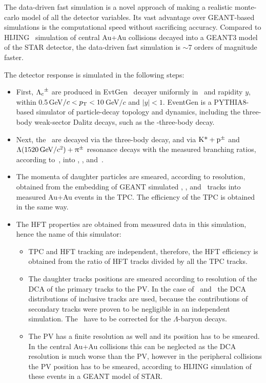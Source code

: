 The data-driven fast simulation is a novel approach of making a realistic monte-carlo model of all the detector variables. Its vast advantage over GEANT-based~\cite{GEANT} simulations is the computational speed without sacrificing accuracy. Compared to HIJING~\cite{HIJING} simulation of central Au+Au collisions decayed into a GEANT3 model of the STAR detector, the data-driven fast simulation is $\sim$7 orders of magnitude faster.

The detector response is simulated in the following steps:
\begin{itemize}
 \item First, ${\Lambda_\text{c}}^\pm$ are produced in EvtGen~\cite{EvtGen} decayer uniformly in \pt\ and rapidity $y$, within 0.5$\,$GeV$/c < {p_{\mathrm{T}}} < 10\,$GeV$/c$ and $|y| < 1$\@. EventGen is a PYTHIA8-based simulator of particle-decay topology and dynamics, including the three-body weak-sector Dalitz decays, such as the \Lambdac-three-body decay.
 \item Next, the \Lambdac\ are decayed via the three-body decay, and via $\text{K*}+\text{p}^\pm$ and $\Lambda(1520\,\text{GeV}/c^2)+\uppi^\pm$ resonance decays with the measured branching ratios, according to~\cite{PDG}, into \ppm, \Kmp, and~\pipm\@.
 \item The momenta of daughter particles are smeared, according to resolution, obtained from the embedding of GEANT simulated \ppm, \Kmp, and \pipm\ tracks into measured Au+Au events in the TPC\@. The efficiency of the TPC is obtained in the same way.
 \item The HFT properties are obtained from measured data in this simulation, hence the name of this simulator:
 \begin{itemize}
  \item TPC and HFT tracking are independent, therefore, the HFT efficiency is obtained from the ratio of HFT tracks divided by all the TPC tracks.
  \item The daughter tracks positions are smeared according to resolution of the DCA of the primary tracks to the PV\@. In the case of \pipm\ and \Kmp\ the DCA distributions of inclusive tracks are used, because the contributions of secondary tracks were proven to be negligible in an independent simulation. The \ppm\ have to be corrected for the $\Lambda$-baryon decays.
  \item The PV has a finite resolution as well and its position has to be smeared. In the central Au+Au collisions this can be neglected as the DCA resolution is much worse than the PV, however in the peripheral collisions the PV position has to be smeared, according to HIJING simulation of these events in a GEANT model of STAR\@.
 \end{itemize}
\end{itemize}

